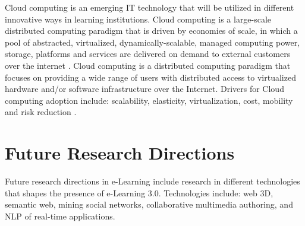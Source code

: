 \documentclass[12pt,a4paper,final,twoside,onecolumn,titlepage]{book}
\begin{document}
Cloud computing is an emerging IT technology that will be utilized in different innovative ways in learning institutions. Cloud computing is a large-scale distributed computing paradigm that is driven by economies of scale, in which a pool of abstracted, virtualized, dynamically-scalable, managed computing power, storage, platforms and services are delivered on demand to external customers over the internet \cite{W31}. Cloud computing is a distributed computing paradigm that focuses on providing a wide range of users with distributed access to virtualized hardware and/or software infrastructure over the Internet. Drivers for Cloud computing adoption include: scalability, elasticity, virtualization, cost, mobility and risk reduction \cite{W32}.

\section{Future Research Directions}
Future research directions in e-Learning include research in different technologies that shapes the presence of e-Learning 3.0. Technologies include: web 3D, semantic web, mining social networks, collaborative multimedia authoring, and NLP of real-time applications.
\end{document}
